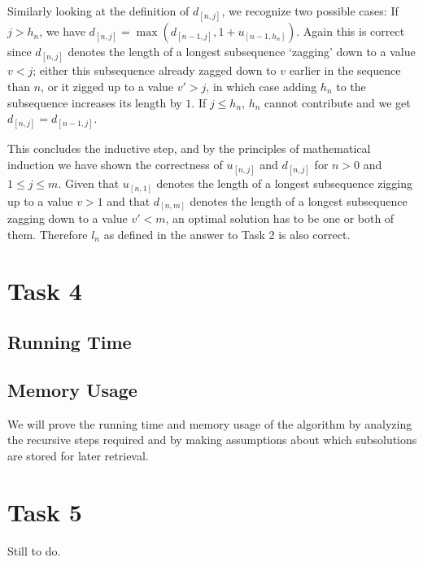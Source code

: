 \documentclass[paper=a4, fleqn]{article}
\begin{document}
Similarly looking at the definition of $d_{[n, j]}$, we recognize two possible
cases: If $j>h_n$, we have $d_{[n, j]}=\max(d_{[n-1,j]},
1+u_{[n-1,h_n]})$. Again this is correct since $d_{[n, j]}$ denotes the length
of a longest subsequence `zagging' down to a value $v<j$; either this
subsequence already zagged down to $v$ earlier in the sequence than $n$, or it
zigged up to a value $v'>j$, in which case adding $h_n$ to the subsequence
increases its length by $1$. If $j\leq h_n$, $h_n$ cannot contribute and we get
$d_{[n, j]}=d_{[n-1, j]}$.

This concludes the inductive step, and by the principles of mathematical
induction we have shown the correctness of $u_{[n, j]}$ and $d_{[n, j]}$ for
$n>0$ and $1\leq j\leq m$. Given that $u_{[n, 1]}$ denotes the length of a
longest subsequence zigging up to a value $v>1$ and that $d_{[n, m]}$ denotes
the length of a longest subsequence zagging down to a value $v'<m$, an optimal
solution has to be one or both of them. Therefore $l_n$ as defined in the answer
to Task 2 is also correct.

\section*{Task 4}

\subsection*{Running Time}



\subsection*{Memory Usage}


We will prove the running time and memory usage of the algorithm by analyzing
the recursive steps required and by making assumptions about which subsolutions
are stored for later retrieval.

\section*{Task 5}

Still to do.
\end{document}
